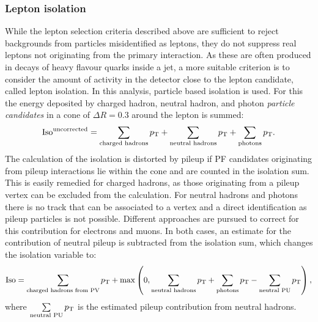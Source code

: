 \subsubsection{Lepton isolation}
While the lepton selection criteria described above are sufficient to reject backgrounds from particles misidentified as leptons, they do not suppress real leptons not originating from the primary interaction. As these are often produced in decays of heavy flavour quarks inside a jet, a more suitable criterion is to consider the amount of activity in the detector close to the lepton candidate, called lepton isolation. In this analysis, particle based isolation is used. For this the energy deposited by charged hadron, neutral hadron, and photon \textit{particle candidates} in a cone of $\Delta R = 0.3$ around the lepton is summed:
\begin{equation}
\text{Iso}^{\text{uncorrected}} = \sum\limits_{\text{charged hadrons}} p_{\mathrm{T}} + \sum\limits_{\text{neutral hadrons}} p_{\mathrm{T}} + \sum\limits_{\text{photons}} p_{\mathrm{T}}.
\end{equation}
The calculation of the isolation is distorted by pileup if PF candidates originating from pileup interactions lie within the cone and are counted in the isolation sum. This is easily remedied for charged hadrons, as those originating from a pileup vertex can be excluded from the calculation. For neutral hadrons and photons there is no track that can be associated to a vertex and a direct identification as pileup particles is not possible. Different approaches are pursued to correct for this contribution for electrons and muons. In both cases, an estimate for the contribution of neutral pileup is subtracted from the isolation sum, which changes the isolation variable to:
\begin{equation}
\text{Iso} = \sum\limits_{\text{charged hadrons from PV}} p_{\mathrm{T}} + \max\left(0, \sum\limits_{\text{neutral hadrons}} p_{\mathrm{T}} + \sum\limits_{\text{photons}} p_{\mathrm{T}} - \sum\limits_{\text{neutral PU}} p_{\mathrm{T}}\right), 
\label{eq:iso}
\end{equation}
where $\sum\limits_{\text{neutral PU}} p_{\mathrm{T}}$ is the estimated pileup contribution from neutral hadrons.
